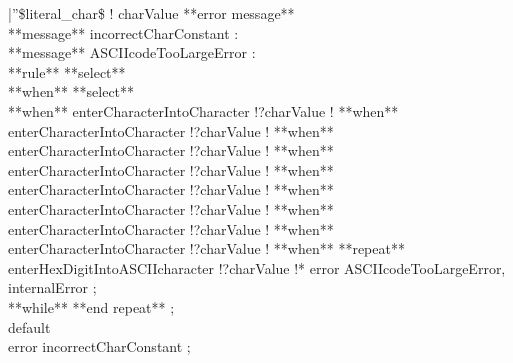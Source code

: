 |''\$literal\_char\$ ! charValue **error message** %
\\
**message** incorrectCharConstant : %
\\
**message** ASCIIcodeTooLargeError : %
\\
**rule** %
 **select**\\
 **when** %
  **select**\\
  **when** %
   enterCharacterIntoCharacter !?charValue !%
  **when** %
   enterCharacterIntoCharacter !?charValue !%
  **when** %
   enterCharacterIntoCharacter !?charValue !%
  **when** %
   enterCharacterIntoCharacter !?charValue !%
  **when** %
   enterCharacterIntoCharacter !?charValue !%
  **when** %
   enterCharacterIntoCharacter !?charValue !%
  **when** %
   enterCharacterIntoCharacter !?charValue !%
  **when** %
   enterCharacterIntoCharacter !?charValue !%
  **when** %
   **repeat**\\
    enterHexDigitIntoASCIIcharacter !?charValue !* error ASCIIcodeTooLargeError, internalError ;\\
   **while** %
   **end repeat** ;\\
  default\\
   error incorrectCharConstant ;\\
